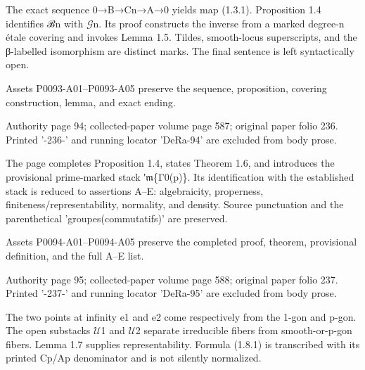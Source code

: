 \documentclass[11pt,a4paper]{article}
\begin{document}
The exact sequence 0→B→C\textunderscore{}n→A→0 yields map (1.3.1). Proposition 1.4 identifies ℬ\textunderscore{}n with \ensuremath{\mathcal{G}}\textunderscore{}n. Its proof constructs the inverse from a marked degree-n étale covering and invokes Lemma 1.5. Tildes, smooth-locus superscripts, and the β-labelled isomorphism are distinct marks. The final sentence is left syntactically open.

Assets P0093-A01--P0093-A05 preserve the sequence, proposition, covering construction, lemma, and exact ending.


\par\medskip
\hypertarget{D018-P0094}{}
\par\smallskip
Authority page 94; collected-paper volume page 587; original paper folio 236. Printed '-236-' and running locator 'DeRa-94' are excluded from body prose.

The page completes Proposition 1.4, states Theorem 1.6, and introduces the provisional prime-marked stack ′\ensuremath{\mathfrak{m}}\textunderscore{}\{Γ\textunderscore{}0(p)\}. Its identification with the established stack is reduced to assertions A--E: algebraicity, properness, finiteness/representability, normality, and density. Source punctuation and the parenthetical 'groupes(commutatifs)' are preserved.

Assets P0094-A01--P0094-A05 preserve the completed proof, theorem, provisional definition, and the full A--E list.


\par\medskip
\hypertarget{D018-P0095}{}
\par\smallskip
Authority page 95; collected-paper volume page 588; original paper folio 237. Printed '-237-' and running locator 'DeRa-95' are excluded from body prose.

The two points at infinity e\textunderscore{}1 and e\textunderscore{}2 come respectively from the 1-gon and p-gon. The open substacks \ensuremath{\mathcal{U}}\textunderscore{}1 and \ensuremath{\mathcal{U}}\textunderscore{}2 separate irreducible fibers from smooth-or-p-gon fibers. Lemma 1.7 supplies representability. Formula (1.8.1) is transcribed with its printed C\textunderscore{}p/A\textunderscore{}p denominator and is not silently normalized.
\end{document}
